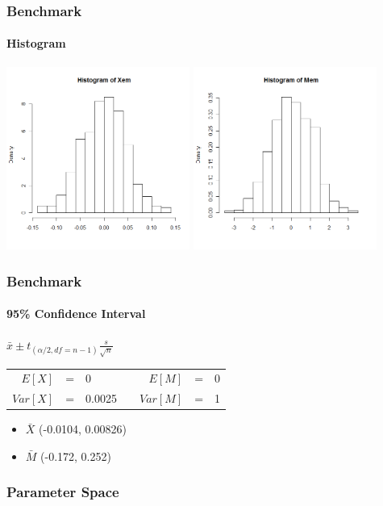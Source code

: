 \begin{frame}
    \frametitle{Benchmark}
	\framesubtitle{Histogram}
\hspace*{-5mm}
\includegraphics[height=6cm]{testhistX}
\includegraphics[height=6cm]{testhistM}
\end{frame}


\begin{frame}
    \frametitle{Benchmark}
	\framesubtitle{95\% Confidence Interval}
\begin{center}
	$\bar{x} \pm t_{(\alpha /2, df=n-1)} \frac{s}{\sqrt{n}}$ \\ 
\vspace{5mm}
\begin{tabular}{r c l c r c l}
	$E[X]$ &=& 0 && $E[M]$ &=& 0 \\
	$Var[X]$ &=& 0.0025  && $Var[M]$ &=& 1 
\end{tabular}
\end{center}
\begin{itemize}
	\item $\bar{X}$ (-0.0104, 0.00826)
	\item $\bar{M}$ (-0.172, 0.252)
\end{itemize}
\end{frame}


\begin{frame}
    \frametitle{Parameter Space}
\end{frame}



